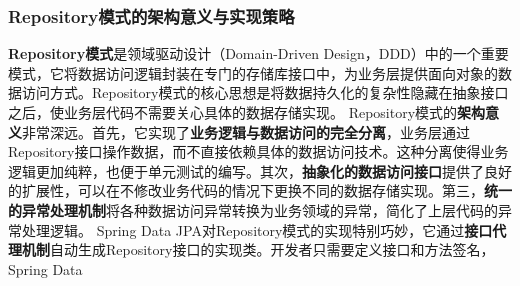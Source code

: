 \subsubsection{Repository模式的架构意义与实现策略}\label{repositoryux6a21ux5f0fux7684ux67b6ux6784ux610fux4e49ux4e0eux5b9eux73b0ux7b56ux7565}
\textbf{Repository模式}是领域驱动设计（Domain-Driven
Design，DDD）中的一个重要模式，它将数据访问逻辑封装在专门的存储库接口中，为业务层提供面向对象的数据访问方式。Repository模式的核心思想是将数据持久化的复杂性隐藏在抽象接口之后，使业务层代码不需要关心具体的数据存储实现。
Repository模式的\textbf{架构意义}非常深远。首先，它实现了\textbf{业务逻辑与数据访问的完全分离}，业务层通过Repository接口操作数据，而不直接依赖具体的数据访问技术。这种分离使得业务逻辑更加纯粹，也便于单元测试的编写。其次，\textbf{抽象化的数据访问接口}提供了良好的扩展性，可以在不修改业务代码的情况下更换不同的数据存储实现。第三，\textbf{统一的异常处理机制}将各种数据访问异常转换为业务领域的异常，简化了上层代码的异常处理逻辑。
Spring Data JPA对Repository模式的实现特别巧妙，它通过\textbf{接口代理机制}自动生成Repository接口的实现类。开发者只需要定义接口和方法签名，Spring Data
